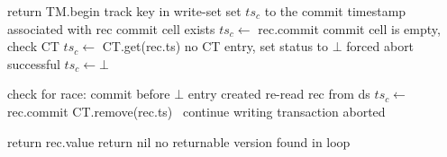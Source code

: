 \begin{algorithm}[t]
  \begin{algorithmic}
 \small
       \State  return TM.begin
\EndProcedure
\Statex
       \State  track key in write-set 
       \State {}
       \State    {}
\EndProcedure
%     
\Statex
{} 
			\State \Comment  set $ts_c$ to the commit timestamp associated with rec
			  \Comment commit cell exists
     				\State $ts_c \leftarrow$  rec.commit 
			\Else \Comment commit cell is empty, check CT
      				\State $ts_c  \leftarrow$ CT.get(rec.ts)  
      				  \Comment no CT entry, set status to  $\bot$
      					\State {}  
      					  \Comment forced abort successful 
      						\State $ts_c  \leftarrow \bot$ 
      					\EndIf
				\EndIf
      				
 				 	\State \Comment check for race: commit before $\bot$ entry  created 
 				 	\State re-read rec from ds
 				 		 \State $ts_c \leftarrow$  rec.commit 
 				 		 \State CT.remove(rec.ts)
 				 	\Else\  
 				 		 continue	\Comment writing transaction aborted	
 				 	\EndIf
				\EndIf
			\EndIf

 			 	\State return  rec.value 
			\EndIf
      \EndFor
      \State  return nil \Comment no returnable version found in loop
      \EndProcedure

\Statex

{}
\end{algorithmic}
\end{algorithm}
